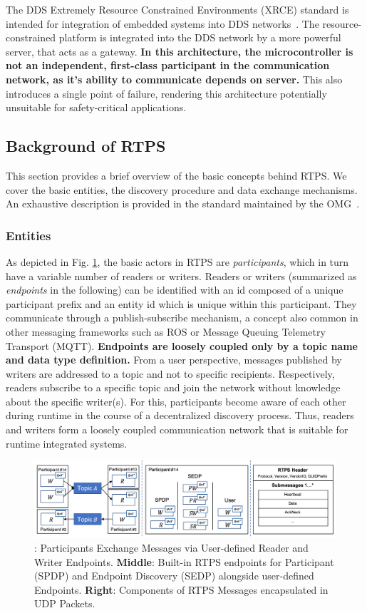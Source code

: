 The DDS Extremely Resource Constrained Environments (XRCE) standard is intended for integration of embedded systems into DDS networks~\cite{XRCE}. The resource-constrained platform is integrated into the DDS network by a more powerful server, that acts as a gateway. \textbf{In this architecture, the microcontroller is not an independent, ﬁrst-class participant in the communication network, as it's ability to communicate depends on server.} This also introduces a single point of failure, rendering this architecture potentially unsuitable for safety-critical applications.

\subsection{Background of RTPS}
This section provides a brief overview of the basic concepts behind RTPS. We cover the basic entities, the discovery procedure and data exchange mechanisms. An exhaustive description is provided in the standard maintained by the OMG~\cite{RTPS}.

\subsubsection{Entities}
As depicted in Fig. \ref{f:rtps}, the basic actors in RTPS are \textit{participants}, which in turn have a variable number of readers or writers. Readers or writers (summarized as \textit{endpoints} in the following) can be identified with an id composed of a unique participant prefix and an entity id which is unique within this participant. They communicate through a publish-subscribe mechanism, a concept also common in other messaging frameworks such as ROS or Message Queuing Telemetry Transport (MQTT). \textbf{Endpoints are loosely coupled only by a topic name and data type definition.} From a user perspective, messages published by writers are addressed to a topic and not to specific recipients. Respectively, readers subscribe to a specific topic and join the network without knowledge about the specific writer(s). For this, participants become aware of each other during runtime in the course of a decentralized discovery process. Thus, readers and writers form a loosely coupled communication network that is suitable for runtime integrated systems.
\begin{figure}[htb!]
    \centering
    \includegraphics[width=0.95\linewidth]{Img/RTPS.jpg}
    \caption{: Participants Exchange Messages via User-defined Reader and Writer Endpoints. \textbf{Middle}: Built-in RTPS endpoints for Participant (SPDP) and Endpoint Discovery (SEDP) alongside user-defined Endpoints. \textbf{Right}: Components of RTPS Messages encapsulated in UDP Packets.}\label{f:rtps}
    \vspace{-0.1in}
\end{figure}

